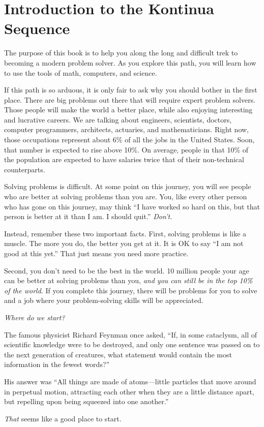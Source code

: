 \chapter{Introduction to the Kontinua Sequence}

The purpose of this book is to help you  along the long and difficult trek to becoming a modern
problem solver. As you explore this path, you will learn how to use the tools of
math, computers, and science.

If this path is so arduous, it is only fair to ask why you should bother in the first place. There are big problems out there that will
require expert problem solvers. Those people will make the world a
better place, while also enjoying interesting and lucrative careers. We are
talking about engineers, scientists, doctors, computer programmers,
architects, actuaries, and mathematicians. Right now, those occupations represent
about 6\% of all the jobs in the United States. Soon,
that number is expected to rise above 10\%.  On average, people in
that 10\% of the population are expected to have salaries twice that
of their non-technical counterparts.

Solving problems is difficult. At some point on this journey, you will
see people who are better at solving problems than you are. You, like
every other person who has gone on this journey, may think ``I have
worked so hard on this, but that person is better at it than
I am. I should quit.'' \textit{Don't}.

Instead, remember these two important facts. First, solving problems is like a muscle. The more you do, the better
you get at it. It is OK to say ``I am not good at this yet.'' That
just means you need more practice.

Second, you don't need to be the best in the world. 10 million people
your age can be better at solving problems than you, \textit{and you
 can still be in the top 10\% of the world}. If you complete this
journey, there will be problems for you to solve and a job where your
problem-solving skills will be appreciated.

\emph{Where do we start?}

The famous physicist Richard Feynman once asked, ``If,
in some cataclysm, all of scientific knowledge were to be destroyed,
and only one sentence was passed on to the next generation of
creatures, what statement would contain the most information in the
fewest words?''

His answer was ``All things are made of atoms—little particles that move around in
perpetual motion, attracting each other when they are a little
distance apart, but repelling upon being squeezed into one another.''

\emph{That} seems like a good place to start.

